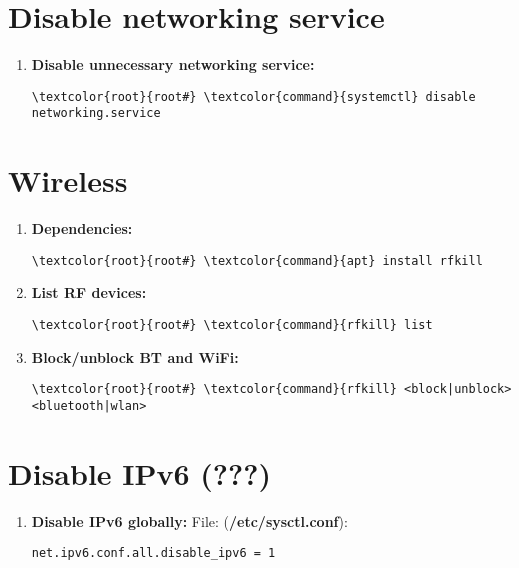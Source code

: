 \documentclass[10pt, a4paper, onecolumn, openany]{book} %
\begin{document}
\section{Disable networking service}
\begin{enumerate}
    \item \textbf{Disable unnecessary networking service:}
\begin{Verbatim}[commandchars=\\\{\}]
\textcolor{root}{root#} \textcolor{command}{systemctl} disable networking.service
\end{Verbatim}
\end{enumerate}
\section{Wireless}
\begin{enumerate}
    \item \textbf{Dependencies:}
\begin{Verbatim}[commandchars=\\\{\}]
\textcolor{root}{root#} \textcolor{command}{apt} install rfkill
\end{Verbatim}
    \item \textbf{List RF devices:}
\begin{Verbatim}[commandchars=\\\{\}]
\textcolor{root}{root#} \textcolor{command}{rfkill} list
\end{Verbatim}
    \item \textbf{Block/unblock BT and WiFi:}
\begin{Verbatim}[commandchars=\\\{\}]
\textcolor{root}{root#} \textcolor{command}{rfkill} <block|unblock> <bluetooth|wlan>
\end{Verbatim}
\end{enumerate}
\section{Disable IPv6 (???)}
\begin{enumerate}
    \item \textbf{Disable IPv6 globally:}
\newline File: (\textcolor{file}{\textbf{/etc/sysctl.conf}}):
\begin{Verbatim}[commandchars=\\\{\}]
net.ipv6.conf.all.disable_ipv6 = 1
\end{Verbatim}
\end{enumerate}
\end{document}
